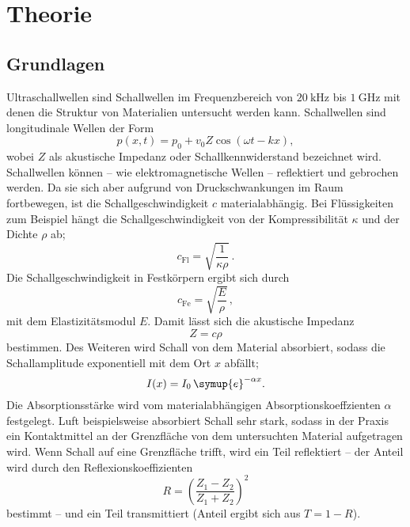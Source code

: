 \section{Theorie}
\label{sec:Theorie}

\subsection{Grundlagen}
Ultraschallwellen sind Schallwellen im Frequenzbereich von $\SI{20}{\kilo\hertz}$ bis
$\SI{1}{\giga\hertz}$ mit denen die Struktur von Materialien untersucht werden kann.
Schallwellen sind longitudinale Wellen der Form
\begin{equation}
	p(x,t) = p_0 + v_0 Z \cos(\omega t - kx) \mathrm{,}
\end{equation}
wobei $Z$ als akustische Impedanz oder Schallkennwiderstand bezeichnet wird.
Schallwellen können -- wie elektromagnetische Wellen -- reflektiert und gebrochen werden.
Da sie sich aber aufgrund von Druckschwankungen im Raum fortbewegen, ist die
Schallgeschwindigkeit $c$ materialabhängig. Bei Flüssigkeiten zum Beispiel hängt die
Schallgeschwindigkeit von der Kompressibilität $\kappa$ und der Dichte $\rho$ ab; 
\begin{equation}
	c_{\mathrm{Fl}} = \sqrt{\frac{1}{\kappa\rho}} \, \mathrm{.}
\end{equation}
Die Schallgeschwindigkeit in Festkörpern ergibt sich durch 
\begin{equation}
	c_{\mathrm{Fe}} = \sqrt{\frac{E}{\rho}} \, \mathrm{,}
\end{equation}
mit dem Elastizitätsmodul $E$.
Damit lässt sich die akustische Impedanz 
\begin{equation}
	Z=c \rho
\end{equation}
bestimmen.
Des Weiteren wird Schall von dem Material absorbiert, sodass die Schallamplitude exponentiell
mit dem Ort $x$ abfällt;
\begin{equation}
	I(x) = I_0 \, \symup{e}^{-\alpha x} \mathrm{.}
\end{equation}
Die Absorptionsstärke wird vom materialabhängigen Absorptionskoeffzienten $\alpha$ festgelegt.
Luft beispielsweise absorbiert Schall sehr stark, sodass in der Praxis ein Kontaktmittel an der
Grenzfläche von dem untersuchten Material aufgetragen wird.
Wenn Schall auf eine Grenzfläche trifft, wird ein Teil reflektiert -- der Anteil wird durch den 
Reflexionskoeffizienten 
\begin{equation}
	R =(\frac{Z_1-Z_2}{Z_1+Z_2})^2
\end{equation}
bestimmt -- und ein Teil transmittiert (Anteil ergibt sich aus $T=1-R$).

